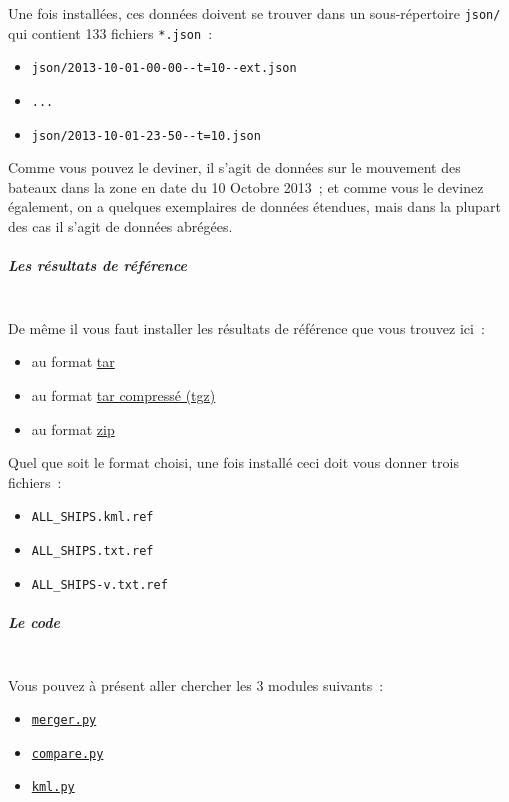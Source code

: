 Une fois installées, ces données doivent se trouver dans un
sous-répertoire \texttt{json/} qui contient 133 fichiers
\texttt{*.json}~:

\begin{itemize}
\tightlist
\item
  \texttt{json/2013-10-01-00-00-\/-t=10-\/-ext.json}
\item
  \texttt{...}
\item
  \texttt{json/2013-10-01-23-50-\/-t=10.json}
\end{itemize}

    Comme vous pouvez le deviner, il s'agit de données sur le mouvement des
bateaux dans la zone en date du 10 Octobre 2013~; et comme vous le
devinez également, on a quelques exemplaires de données étendues, mais
dans la plupart des cas il s'agit de données abrégées.

    \hypertarget{les-ruxe9sultats-de-ruxe9fuxe9rence}{%
\subparagraph{Les résultats de
référence\\\\}\label{les-ruxe9sultats-de-ruxe9fuxe9rence}}

    De même il vous faut installer les résultats de référence que vous
trouvez ici~:

\begin{itemize}
\tightlist
\item
  au format \href{data/ships-ref.tar}{tar}
\item
  au format \href{data/ships-ref.tgz}{tar compressé (tgz)}
\item
  au format \href{data/ships-ref.zip}{zip}
\end{itemize}

Quel que soit le format choisi, une fois installé ceci doit vous donner
trois fichiers~:

\begin{itemize}
\tightlist
\item
  \texttt{ALL\_SHIPS.kml.ref}
\item
  \texttt{ALL\_SHIPS.txt.ref}
\item
  \texttt{ALL\_SHIPS-v.txt.ref}
\end{itemize}

    \hypertarget{le-code}{%
\subparagraph{Le code\\\\}\label{le-code}}

    Vous pouvez à présent aller chercher les 3 modules suivants~:

\begin{itemize}
\tightlist
\item
  \href{data/merger.py}{\texttt{merger.py}}
\item
  \href{data/compare.py}{\texttt{compare.py}}
\item
  \href{data/kml.py}{\texttt{kml.py}}
\end{itemize}

